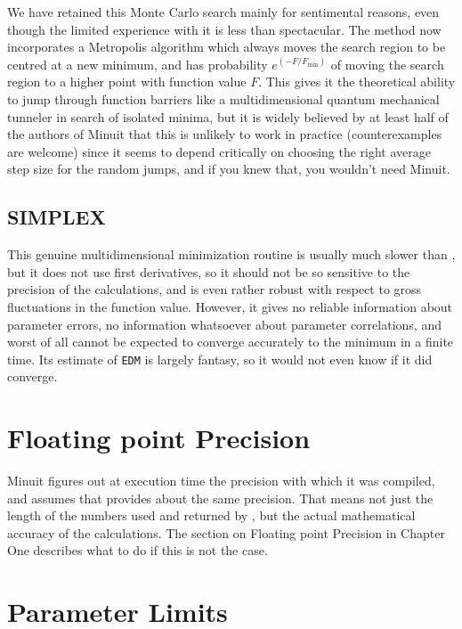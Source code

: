 We have retained this Monte Carlo search mainly for sentimental
reasons, even though the limited experience with it is
less than spectacular.
The method now incorporates a Metropolis algorithm which always
moves the search region to be centred at a new minimum,
and has probability 
$ e ^{(-F/F_{\mathrm{min}})}$
of moving the search region to a higher point with function value $F$.
This gives it the theoretical ability to jump
through function barriers like a multidimensional
quantum mechanical tunneler in search of isolated minima, but it is
widely believed by at least half of the authors of Minuit that this
is unlikely to work in practice (counterexamples are welcome)
since it seems to depend critically on choosing
the right average step size for the random jumps,
and if you knew that, you wouldn't need Minuit.

\subsection{SIMPLEX}

This genuine multidimensional minimization routine is usually much
slower than , but it does not use first derivatives,
so it should not be so sensitive to the precision of the 
calculations, and is even rather robust with respect to
gross fluctuations in the function value.
However, it gives no reliable information about parameter errors,
no information whatsoever about parameter correlations,
and worst of all cannot be expected to converge accurately
to the minimum in a finite time.
Its estimate of \texttt{EDM} is largely fantasy, so it would not even
know if it did converge.

\section{Floating point Precision}

Minuit figures out at execution time the precision with which it was
compiled, and assumes that  provides about the same precision.
That means not just the length of the numbers used and returned
by , but the actual mathematical accuracy of the calculations.
The section on Floating point Precision in Chapter One describes
what to do if this is not the case.

\section{Parameter Limits}


